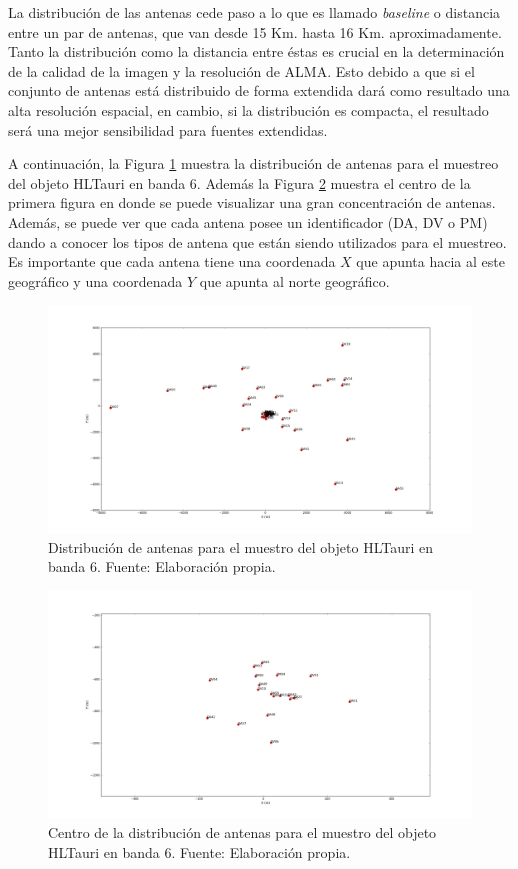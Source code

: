 La distribución de las antenas cede paso a lo que es llamado \textit{baseline} o distancia entre un par de antenas, que van desde 15 Km. hasta 16 Km. aproximadamente. Tanto la distribución como la distancia entre éstas es crucial en la determinación de la calidad de la imagen y la resolución de ALMA. Esto debido a que si el conjunto de antenas está distribuido de forma extendida dará como resultado una alta resolución espacial, en cambio, si la distribución es compacta, el resultado será una mejor sensibilidad para fuentes extendidas.

A continuación, la Figura \ref{fig:almaarray1} muestra la distribución de antenas para el muestreo del objeto HLTauri en banda 6. Además la Figura \ref{fig:almaarray2} muestra el centro de la primera figura en donde se puede visualizar una gran concentración de antenas. Además, se puede ver que cada antena posee un identificador (DA, DV o PM) dando a conocer los tipos de antena que están siendo utilizados para el muestreo. Es importante que cada antena tiene una coordenada $X$ que apunta hacia al este geográfico y una coordenada $Y$ que apunta al norte geográfico.

\begin{figure}[h!]
	\centering
	\includegraphics[scale=0.25]{images/HLTau_B6antennas1.png}
	\caption{Distribución de antenas para el muestro del objeto HLTauri en banda 6. Fuente: Elaboración propia.}
	\label{fig:almaarray1}
\end{figure}

\begin{figure}[h!]
	\centering
	\includegraphics[scale=0.25]{images/HLTau_B6antennasCenter.png}
	\caption{Centro de la distribución de antenas para el muestro del objeto HLTauri en banda 6. Fuente: Elaboración propia.}
	\label{fig:almaarray2}
\end{figure}

